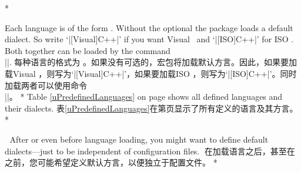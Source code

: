 \begin{syntax}
    \begin{paracol}{2}    
\item {\rstyle\icmdname\lstloadlanguages}
\switchcolumn
\item {\rstyle\icmdname\lstloadlanguages}
\switchcolumn[0]*%

      Each language is of the form . Without
      the optional  the package loads a default dialect. So
      write `|[Visual]C++|' if you want Visual \Cpp\ and `|[ISO]C++|' for
      ISO \Cpp. Both together can be loaded by the command\\
      ||.
      \switchcolumn
      每种语言的格式为 。如果没有可选的，宏包将加载默认方言。因此，如果要加载Visual \Cpp，则写为`|[Visual]C++|'，如果要加载ISO \Cpp，则写为`|[ISO]C++|'。同时加载两者可以使用命令\\||。
      \switchcolumn[0]*%
      Table \ref{uPredefinedLanguages} on page \pageref{uPredefinedLanguages}
      shows all defined languages and their dialects.
      \switchcolumn
      表\ref{uPredefinedLanguages}在第\pageref{uPredefinedLanguages}页显示了所有定义的语言及其方言。
      \switchcolumn[0]*%
    \end{paracol}      
\end{syntax}
\begin{paracol}{2}
^^A After or even before language loading, you might want to define default
^^A dialects---just to be independent of configuration files.
\switchcolumn
^^A在加载语言之后，甚至在之前，您可能希望定义默认方言，以便独立于配置文件。
\switchcolumn[0]*%
\end{paracol}